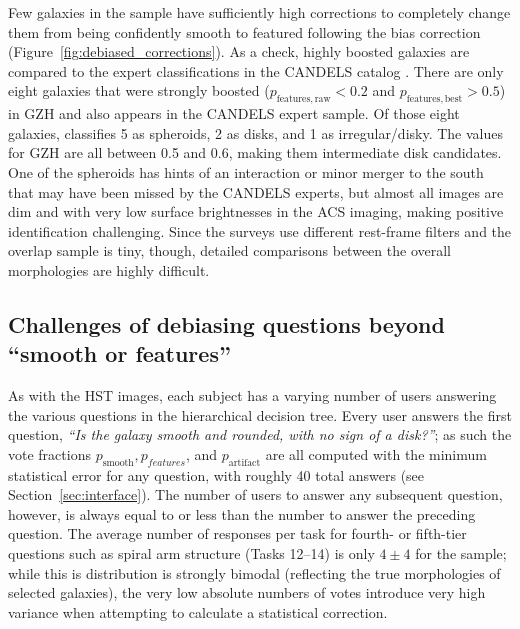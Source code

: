 \documentclass[twocolumn]{aastex6}
\begin{document}
Few galaxies in the sample have sufficiently high corrections to completely change them from being confidently smooth to featured following the bias correction (Figure~\ref{fig:debiased_corrections}). As a check, highly boosted galaxies are compared to the expert classifications in the CANDELS catalog \citep{kar15}. There are only eight galaxies that were strongly boosted ($p_\mathrm{features,raw}<0.2$ and $p_\mathrm{features,best} > 0.5$) in GZH and also appears in the CANDELS expert sample. Of those eight galaxies, \citet{kar15} classifies 5 as spheroids, 2 as disks, and 1 as irregular/disky. The \pbest{} values for GZH are all between 0.5 and 0.6, making them intermediate disk candidates. One of the spheroids has hints of an interaction or minor merger to the south that may have been missed by the CANDELS experts, but almost all images are dim and with very low surface brightnesses in the ACS imaging, making positive identification challenging. Since the surveys use different rest-frame filters and the overlap sample is tiny, though, detailed comparisons between the overall morphologies are highly difficult.


\subsection{Challenges of debiasing questions beyond ``smooth or features''}
\label{ssec:higher_order_tasks}
As with the HST images, each \ferengi{} subject has a varying number of users answering the various questions in the hierarchical decision tree. Every user answers the first question, {\it ``Is the galaxy smooth and rounded, with no sign of a disk?''}; as such the vote fractions $p_\mathrm{smooth}, p_{features}$, and $p_\mathrm{artifact}$ are all computed with the minimum statistical error for any question, with roughly 40 total answers (see Section~\ref{sec:interface}). The number of users to answer any subsequent question, however, is always equal to or less than the number to answer the preceding question. The average number of responses per task for fourth- or fifth-tier questions such as spiral arm structure (Tasks 12--14) is only $4\pm4$ for the \ferengi{} sample; while this is distribution is strongly bimodal (reflecting the true morphologies of selected galaxies), the very low absolute numbers of votes introduce very high variance when attempting to calculate a statistical correction.
\end{document}
